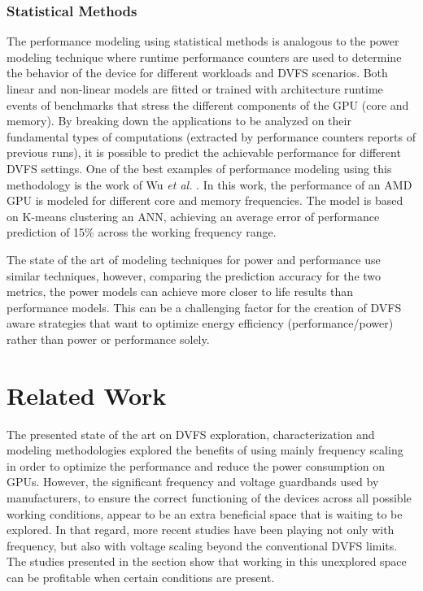 \subsubsection{Statistical Methods}
The performance modeling using statistical methods is analogous to the power modeling technique where runtime performance counters are used to determine the behavior of the device for different workloads and DVFS scenarios. Both linear and non-linear models are fitted or trained with architecture runtime events of benchmarks that stress the different components of the GPU (core and memory). By breaking down the applications to be analyzed on their fundamental types of computations (extracted by performance counters reports of previous runs), it is possible to predict the achievable performance for different DVFS settings. One of the best examples of performance modeling using this methodology is the work of Wu \textit{et al.} \cite{wu_gpgpu_2015}. In this work, the performance of an AMD GPU is modeled for different core and memory frequencies. The model is based on K-means clustering an ANN, achieving an average error of performance prediction of 15\% across the working frequency range.

The state of the art of modeling techniques for power and performance use similar techniques, however, comparing the prediction accuracy for the two metrics, the power models can achieve more closer to life results than performance models. This can be a challenging factor for the creation of DVFS aware strategies that want to optimize energy efficiency (performance/power) rather than power or performance solely.

\section{Related Work}

The presented state of the art on DVFS exploration, characterization and modeling methodologies explored the benefits of using mainly frequency scaling in order to optimize the performance and reduce the power consumption on GPUs. However, the significant frequency and voltage guardbands used by manufacturers, to ensure the correct functioning of the devices across all possible working conditions, appear to be an extra beneficial space that is waiting to be explored.  In that regard, more recent studies have been playing not only with frequency, but also with voltage scaling beyond the conventional DVFS limits. The studies presented in the section show that working in this unexplored space can be profitable when certain conditions are present.

